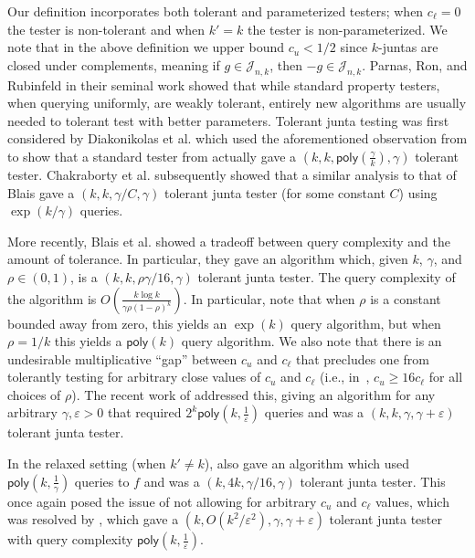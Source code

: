 \documentclass[10pt,a4paper]{article}
\providecommand{\poly}{\mathsf{poly}}
\newcommand{\say}[1]{``#1''}
\theoremstyle{plain}
\theoremstyle{remark}
\theoremstyle{plain}
\newcommand{\eps}{\varepsilon}
\newcommand{\Juntas}[2]{\mathcal{J}_{#1, #2}}
\begin{document}
Our definition incorporates both tolerant and parameterized testers; when $c_\ell = 0$ the tester is non-tolerant and when $k' = k$ the tester is non-parameterized. We note that in the above definition we upper bound $c_u<1/2$ since $k$-juntas are closed under complements, meaning if $g \in \Juntas{n}{k}$, then $-g \in \Juntas{n}{k}$. Parnas, Ron, and Rubinfeld in their seminal work \cite{og-tolerant}  showed that while standard property testers, when querying uniformly, are weakly tolerant, entirely new algorithms are usually needed to tolerant test with better parameters. Tolerant junta testing was first considered by Diakonikolas et al. \cite{DBLP:conf/focs/DiakonikolasLMORSW07} which used the aforementioned observation from \cite{og-tolerant} to show that a standard tester from \cite{FischerKRSS04} actually gave a $(k, k, \poly(\frac{\gamma}{k}), \gamma)$ tolerant tester. Chakraborty et al. \cite{DBLP:conf/coco/ChakrabortyFGM12} subsequently showed that a similar analysis to that of Blais \cite{og-junta-testing} gave a $(k, k, \gamma/C, \gamma)$ tolerant junta tester (for some constant $C$) using $\exp(k/\gamma)$ queries.

More recently, Blais et al. \cite[Theorem 1.2]{junta-submodular-opt} showed a tradeoff between query complexity and the amount of tolerance. In particular, they gave an algorithm which, given $k$, $\gamma$, and $\rho\in(0,1)$, is a $(k, k, \rho\gamma/16, \gamma)$ tolerant junta tester. The query complexity of the algorithm is $O\!\left(\frac{k\log k}{\gamma \rho (1-\rho)^k}\right )$. In particular, note that when $\rho$ is a constant bounded away from zero, this yields an $\exp(k)$ query algorithm, but when $\rho = 1/k$ this yields a $\poly(k)$ query algorithm. We also note that there is  an undesirable multiplicative \say{gap} between $c_u$ and $c_\ell$ that precludes one from tolerantly testing for arbitrary close values of $c_u$ and $c_\ell$ (i.e., in~\cite{junta-submodular-opt},  $c_u \ge 16 c_{\ell}$ for all choices of $\rho$). 
The recent work of \cite{junta-coordinate-oracles} addressed this, giving an algorithm for any arbitrary $\gamma, \eps>0$ that required $2^k\poly(k,\frac{1}{\eps})$ queries and was a $(k, k, \gamma, \gamma+\eps)$ tolerant junta tester.

In the relaxed setting (when $k' \neq k$), \cite[Theorem 1.1]{junta-submodular-opt} also gave an algorithm which used $\poly(k, \frac{1}{\gamma})$ queries to $f$ and was a $(k, 4k, \gamma/16, \gamma)$ tolerant junta tester. This once again posed the issue of not allowing for arbitrary $c_u$ and $c_\ell$ values, which was resolved by \cite[Corollary 1.6]{junta-coordinate-oracles}, which gave a $(k, O(k^2/\eps^2), \gamma, \gamma+\eps)$ tolerant junta tester with query complexity $\poly(k, \frac{1}{\eps})$. 
\end{document}
